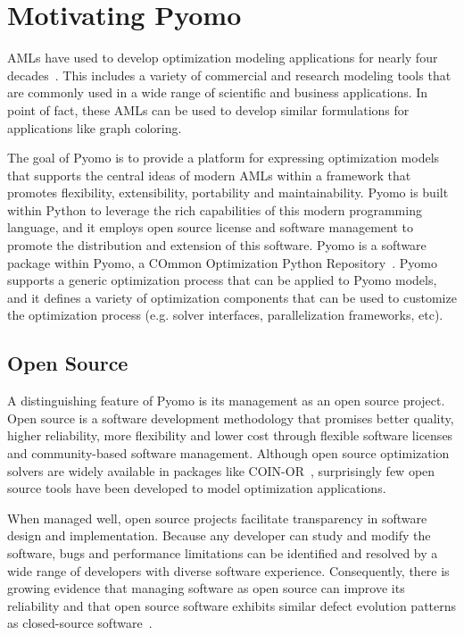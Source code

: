\section{Motivating Pyomo}
\label{sec:intro:pyomo}

AMLs have used to develop optimization modeling applications for
nearly four decades~\cite{Kal04}.  This includes a variety of commercial
and research modeling tools that are commonly used in a wide range of
scientific and business applications.  In point of fact, these AMLs can be
used to develop similar formulations for applications like graph coloring.

The goal of Pyomo is to provide a platform for expressing 
optimization models that supports the central ideas of modern AMLs
within a framework that promotes flexibility, extensibility, portability
and maintainability.  Pyomo is built within Python to leverage the rich
capabilities of this modern programming language, and it employs open
source license and software management to promote the distribution and
extension of this software.  Pyomo is a software package within Pyomo,
a COmmon Optimization Python Repository~\citep{Pyomo}.  Pyomo supports
a generic optimization process that can be applied to Pyomo models,
and it defines a variety of optimization components that can be
used to customize the optimization process (e.g. solver interfaces,
parallelization frameworks, etc).


\subsection{Open Source}

A distinguishing feature of Pyomo is its management as an open source
project. Open source is a software development methodology that promises
better quality, higher reliability, more flexibility and lower cost
through flexible software licenses and community-based software management.
Although open source optimization solvers are widely available in packages
like COIN-OR~\citep{COINOR}, surprisingly few open source tools have
been developed to model optimization applications.

When managed well, open source projects facilitate transparency in
software design and implementation. Because any developer can study
and modify the software, bugs and performance limitations can be
identified and resolved by a wide range of developers with diverse
software experience.  Consequently, there is growing evidence that
managing software as open source can improve its reliability and that
open source software exhibits similar defect evolution patterns as
closed-source software~\citep{fedora-oss,oss-reliabilitymodel}.

